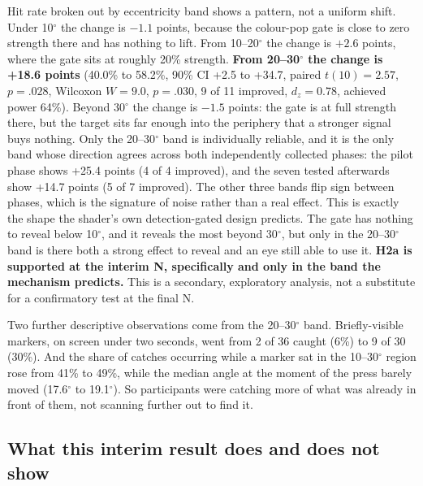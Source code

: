Hit rate broken out by eccentricity band shows a pattern, not a uniform shift. Under 10$^{\circ}$ the
change is $-1.1$ points, because the colour-pop gate is close to zero strength there and has nothing
to lift. From 10–20$^{\circ}$ the change is $+2.6$ points, where the gate sits at roughly 20\% strength.
\textbf{From 20–30$^{\circ}$ the change is +18.6 points} (40.0\% to 58.2\%, 90\% CI +2.5 to +34.7,
paired $t(10) = 2.57$, $p = .028$, Wilcoxon $W = 9.0$, $p = .030$, 9 of 11 improved, $d_z = 0.78$,
achieved power 64\%). Beyond 30$^{\circ}$ the change is $-1.5$ points: the gate is at full strength
there, but the target sits far enough into the periphery that a stronger signal buys nothing. Only the
20–30$^{\circ}$ band is individually reliable, and it is the only band whose direction agrees across
both independently collected phases: the pilot phase shows +25.4 points (4 of 4 improved), and the
seven tested afterwards show +14.7 points (5 of 7 improved). The other three bands flip sign between
phases, which is the signature of noise rather than a real effect. This is exactly the shape the
shader's own detection-gated design predicts. The gate has nothing to reveal below 10$^{\circ}$, and it
reveals the most beyond 30$^{\circ}$, but only in the 20–30$^{\circ}$ band is there both a strong effect
to reveal and an eye still able to use it. \textbf{H2a is supported at the interim N, specifically and
only in the band the mechanism predicts.} This is a secondary, exploratory analysis, not a substitute
for a confirmatory test at the final N.

Two further descriptive observations come from the 20–30$^{\circ}$ band. Briefly-visible markers, on
screen under two seconds, went from 2 of 36 caught (6\%) to 9 of 30 (30\%). And the share of catches
occurring while a marker sat in the 10–30$^{\circ}$ region rose from 41\% to 49\%, while the median angle
at the moment of the press barely moved (17.6$^{\circ}$ to 19.1$^{\circ}$). So participants were catching
more of what was already in front of them, not scanning further out to find it.

\subsection{What this interim result does and does not show}

